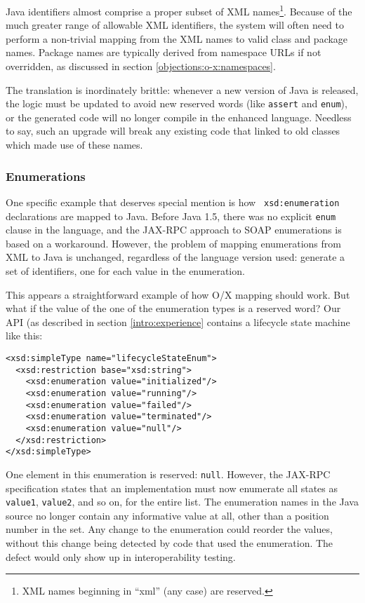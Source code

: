 Java identifiers almost comprise a proper subset of XML
names\footnote{XML names beginning in ``xml'' (any case) are reserved.}.
Because of the much greater range of allowable XML identifiers, the
system will often need to perform a non-trivial mapping from the XML
names to valid class and package names. Package names are typically
derived from namespace URLs if not overridden, as discussed in section
\ref{objections:o-x:namespaces}.

The translation is inordinately brittle: whenever a new
version of Java is released, the logic must be updated to avoid new
reserved words (like {\tt assert} and {\tt enum}), or the generated
code will no longer compile in the enhanced language. Needless to say,
such an upgrade will break any existing code that linked to old
classes which made use of these names.

\subsubsection{Enumerations}
\label{objections:o-x:enum}

One specific example that deserves special mention is how {\tt
xsd:enumeration} declarations are mapped to Java. Before Java 1.5,
there was no explicit {\tt enum} clause in the language, and the
JAX-RPC approach to SOAP enumerations is based on a
workaround. However, the problem of mapping enumerations from XML to
Java is unchanged, regardless of the language version used: generate a
set of identifiers, one for each value in the enumeration.

This appears a straightforward example of how O/X mapping should
work. But what if the value of the one of the enumeration types is a
reserved word?  Our API (as described in section
\ref{intro:experience} contains a lifecycle state machine like this:

\begin{verbatim}
<xsd:simpleType name="lifecycleStateEnum">
  <xsd:restriction base="xsd:string"> 
    <xsd:enumeration value="initialized"/> 
    <xsd:enumeration value="running"/> 
    <xsd:enumeration value="failed"/> 
    <xsd:enumeration value="terminated"/> 
    <xsd:enumeration value="null"/> 
  </xsd:restriction>
</xsd:simpleType>
\end{verbatim}

One element in this enumeration is reserved: {\tt null}. However, the
JAX-RPC specification states that an implementation must now enumerate
all states as {\tt value1}, {\tt value2}, and so on, for the entire
list.  The enumeration names in the Java source no longer contain any
informative value at all, other than a position number in the set. Any
change to the enumeration could reorder the values, without this
change being detected by code that used the enumeration. The defect
would only show up in interoperability testing.


